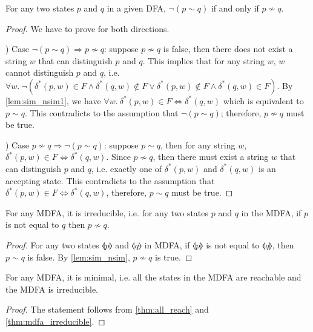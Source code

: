 \begin{lem}
\label{lem:sim_nsim}
\noindent For any two states \(p\) and \(q\) in a given DFA, \(\neg (p
\sim q)\) if and only if \(p \nsim q\). 
\end{lem}

\begin{proof}
\noindent We have to prove for both directions.

\par {}) Case \(\neg (p \sim q) \Rightarrow p \nsim
q\): suppose \(p \nsim q\) is false, then there does not exist a
string \(w\) that can distinguish \(p\) and \(q\). This implies that for any string \(w\), \(w\) cannot
distinguish \(p\) and \(q\), i.e. \(\forall w.\ \neg (\delta^*(p,w) \in F \wedge \delta^*(q,w) \notin F \vee
\delta^*(p,w) \notin F \wedge \delta^*(q,w) \in F)\). By
\autoref{lem:sim_nsim1}, we have \(\forall w.\ \delta^*(p,w) \in F
\Leftrightarrow \delta^*(q,w)\) which is equivalent to \(p \sim
q\). This contradicts to the assumption that \(\neg (p \sim q)\);
therefore, \(p \nsim q\) must be true. 

\par {}) Case \(p \nsim q \Rightarrow \neg (p \sim q)\): suppose \(p \sim q\), then for any string \(w\),
\(\delta^*(p,w) \in F \Leftrightarrow \delta^*(q,w)\). Since \(p \nsim
q\), then there must exist a string \(w\)
that can distinguish \(p\) and \(q\), i.e. exactly one of
\(\delta^*(p,w)\) and \(\delta^*(q,w)\) is an accepting state. This
contradicts to the assumption that \(\delta^*(p,w) \in F
\Leftrightarrow \delta^*(q,w)\), therefore, \(p \sim q\) must be true. 
\end{proof}

\begin{thm}
\label{thm:mdfa_irreducible}
\noindent For any MDFA, it is irreducible, i.e. for any two states
\(p\) and \(q\) in the MDFA, if \(p\) is not equal to \(q\) then \(p \nsim q\). 
\end{thm}

\begin{proof}
\noindent For any two states \(\llangle p \rrangle\) and \(\llangle q
\rrangle\) in MDFA, if \(\llangle p \rrangle\) is not equal to \(\llangle q
\rrangle\), then \(p \sim q\) is false. By \autoref{lem:sim_nsim},
\(p \nsim q\) is true. 
\end{proof}

\begin{thm}
\noindent For any MDFA, it is minimal, i.e. all the states in the MDFA
are reachable and the MDFA is irreducible. 
\end{thm}

\begin{proof}
\noindent The statement follows from \autoref{thm:all_reach}
and \autoref{thm:mdfa_irreducible}. 
\end{proof}


